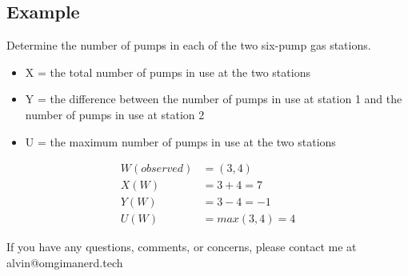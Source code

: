\documentclass[letterpaper, 12pt]{math}
\begin{document}
\subsection*{Example}
Determine the number of pumps in each of the two six-pump gas stations.
\begin{itemize}
  \item X = the total number of pumps in use at the two stations
  \item Y = the difference between the number of pumps in use at station 1 and
    the number of pumps in use at station 2
  \item U = the maximum number of pumps in use at the two stations
\end{itemize}
\begin{align*}
  W(observed) &= (3,4) \\
  X(W) &= 3+4 = 7 \\
  Y(W) &= 3-4 = -1 \\
  U(W) &= max(3,4) = 4
\end{align*}

\begin{center}
  If you have any questions, comments, or concerns, please contact me at
  alvin@omgimanerd.tech
\end{center}
\end{document}

